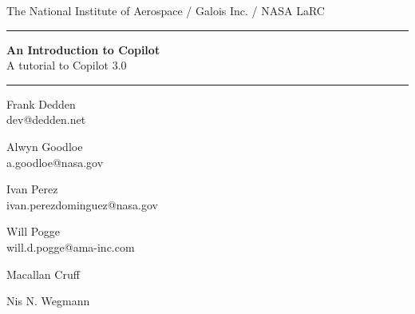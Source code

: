 \documentclass[12pt]{article}
\theoremstyle{example}
\newcommand{\HRule}{\rule{\linewidth}{0.25pt}}
\begin{document}
\thispagestyle{empty}

\begin{center}

The National Institute of Aerospace / Galois Inc. / NASA LaRC

\vspace{0.1cm}

\HRule

\vspace{0.6cm}

{\Huge \bfseries
An Introduction to Copilot
}\\
A tutorial to Copilot 3.0
\HRule

\vspace{1cm}

\begin{minipage}{0.3\textwidth}
\large
\begin{center}
Frank Dedden\\
\small{
dev@dedden.net\\
}
\end{center}
\end{minipage}
%
\begin{minipage}{0.3\textwidth}
\large
\begin{center}
Alwyn Goodloe\\
\small{
a.goodloe@nasa.gov\\
}
\end{center}
\end{minipage}

\vspace{1cm}

\begin{minipage}{0.3\textwidth}
\large
\begin{center}
Ivan Perez\\
\small{
ivan.perezdominguez@nasa.gov\\
}
\end{center}
\end{minipage}
%
\begin{minipage}{0.3\textwidth}
\large
\begin{center}
Will Pogge\\
\small{
will.d.pogge@ama-inc.com\\
}
\end{center}
\end{minipage}

\vspace{1cm}

\begin{minipage}{0.3\textwidth}
\large
\begin{center}
Macallan Cruff\\
\end{center}
\end{minipage}
%
\begin{minipage}{0.3\textwidth}
\large
\begin{center}
Nis N. Wegmann\\
\end{center}
\end{minipage}


\end{center}
\end{document}
